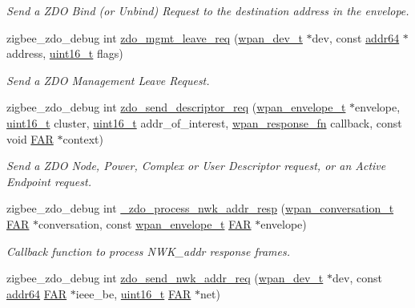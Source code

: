 \begin{DoxyCompactItemize}
\begin{DoxyCompactList}\small\item\em Send a Z\+DO Bind (or Unbind) Request to the destination address in the envelope. \end{DoxyCompactList}\item 
zigbee\+\_\+zdo\+\_\+debug int \hyperlink{group__zdo_ga4ab17250ec2957d91a6ef4f1377ab62d}{zdo\+\_\+mgmt\+\_\+leave\+\_\+req} (\hyperlink{structwpan__dev__t}{wpan\+\_\+dev\+\_\+t} $\ast$dev, const \hyperlink{unionaddr64}{addr64} $\ast$address, \hyperlink{group__hal__dos_ga5a8b2dc9e45a9ee81a94ef304fb62505}{uint16\+\_\+t} flags)
\begin{DoxyCompactList}\small\item\em Send a Z\+DO Management Leave Request. \end{DoxyCompactList}\item 
zigbee\+\_\+zdo\+\_\+debug int \hyperlink{group__zdo_gac842062e5e1a60d25cddf16ec22ef601}{zdo\+\_\+send\+\_\+descriptor\+\_\+req} (\hyperlink{structwpan__envelope__t}{wpan\+\_\+envelope\+\_\+t} $\ast$envelope, \hyperlink{group__hal__dos_ga5a8b2dc9e45a9ee81a94ef304fb62505}{uint16\+\_\+t} cluster, \hyperlink{group__hal__dos_ga5a8b2dc9e45a9ee81a94ef304fb62505}{uint16\+\_\+t} addr\+\_\+of\+\_\+interest, \hyperlink{group__wpan__aps_gabf0a6b85c9ff3ff9104c8b58c1436d72}{wpan\+\_\+response\+\_\+fn} callback, const void \hyperlink{group__hal_gaef060b3456fdcc093a7210a762d5f2ed}{F\+AR} $\ast$context)
\begin{DoxyCompactList}\small\item\em Send a Z\+DO Node, Power, Complex or User Descriptor request, or an Active Endpoint request. \end{DoxyCompactList}\item 
zigbee\+\_\+zdo\+\_\+debug int \hyperlink{group__zdo_ga9c1afb2178cc3e3b515373c7e351fc02}{\+\_\+zdo\+\_\+process\+\_\+nwk\+\_\+addr\+\_\+resp} (\hyperlink{structwpan__conversation__t}{wpan\+\_\+conversation\+\_\+t} \hyperlink{group__hal_gaef060b3456fdcc093a7210a762d5f2ed}{F\+AR} $\ast$conversation, const \hyperlink{structwpan__envelope__t}{wpan\+\_\+envelope\+\_\+t} \hyperlink{group__hal_gaef060b3456fdcc093a7210a762d5f2ed}{F\+AR} $\ast$envelope)
\begin{DoxyCompactList}\small\item\em Callback function to process N\+W\+K\+\_\+addr response frames. \end{DoxyCompactList}\item 
zigbee\+\_\+zdo\+\_\+debug int \hyperlink{group__zdo_ga40f076c190ab2390836687b8e1f705eb}{zdo\+\_\+send\+\_\+nwk\+\_\+addr\+\_\+req} (\hyperlink{structwpan__dev__t}{wpan\+\_\+dev\+\_\+t} $\ast$dev, const \hyperlink{unionaddr64}{addr64} \hyperlink{group__hal_gaef060b3456fdcc093a7210a762d5f2ed}{F\+AR} $\ast$ieee\+\_\+be, \hyperlink{group__hal__dos_ga5a8b2dc9e45a9ee81a94ef304fb62505}{uint16\+\_\+t} \hyperlink{group__hal_gaef060b3456fdcc093a7210a762d5f2ed}{F\+AR} $\ast$net)

\end{DoxyCompactItemize}
